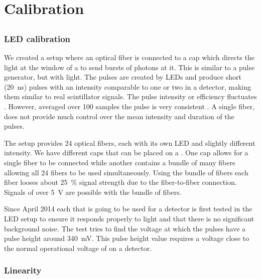 \chapter{Calibration}
\label{ch:calibration}

\section{\pmt}
\label{sec:pmt}


\subsection{LED calibration}
\label{sub:led_calibration}

We created a setup where an optical fiber is connected to a cap which
directs the light at the window of a \pmt to send bursts of photons at
it. This is similar to a pulse generator, but with light. The pulses are
created by LEDs and produce short (\SI{20}{\nano\second}) pulses with an
intensity comparable to one or two \mip in a detector, making them
similar to real scintillator signals. The pulse intensity or efficiency
fluctuates . However,
averaged over 100 samples the pulse is very consistent
. A single fiber,
does not provide much control over the mean intensity and duration of
the pulses.

The setup provides 24 optical fibers, each with its own LED and slightly
different intensity. We have different caps that can be placed on a
\pmt. One cap allows for a single fiber to be connected while another
contains a bundle of many fibers allowing all 24 fibers to be used
simultaneously. Using the bundle of fibers each fiber looses about
\SI{25}{\percent} signal strength due to the fiber-to-fiber connection.
Signals of over \SI{5}{\volt} are possible with the bundle of fibers.

Since April 2014 each \pmt that is going to be used for a \hisparc
detector is first tested in the LED setup to ensure it responds properly
to light and that there is no significant background noise. The test
tries to find the voltage at which the pulses have a pulse height around
\SI{340}{\milli\volt}. This pulse height value requires a voltage close
to the normal operational voltage of \pmts on a \hisparc detector.


\subsection{Linearity}

